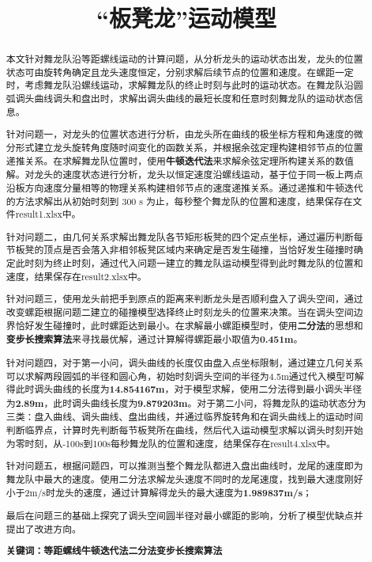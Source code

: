 \documentclass[withoutpreface,bwprint]{cumcmthesis} %
\title{“板凳龙”运动模型}
\begin{document}
	
	\maketitle
	\begin{abstract}
		
	本文针对舞龙队沿等距螺线运动的计算问题，从分析龙头的运动状态出发，龙头的位置状态可由旋转角确定且龙头速度恒定，分别求解后续节点的位置和速度。在螺距一定时，考虑舞龙队沿螺线运动，求解舞龙队的终止时刻与此时的运动状态。在舞龙队沿圆弧调头曲线调头和盘出时，求解出调头曲线的最短长度和任意时刻舞龙队的运动状态信息。
	
	针对问题一，对龙头的位置状态进行分析，由龙头所在曲线的极坐标方程和角速度的微分形式建立龙头旋转角度随时间变化的函数关系，并根据余弦定理构建相邻节点的位置递推关系。在求解舞龙队位置时，使用\textbf{牛顿迭代法}来求解余弦定理所构建关系的数值解。对龙头的速度状态进行分析，龙头以恒定速度沿螺线运动，基于位于同一板上两点沿板方向速度分量相等的物理关系构建相邻节点的速度递推关系。通过递推和牛顿迭代的方法求解出从初始时刻到 300 s 为止，每秒整个舞龙队的位置和速度，结果保存在文件result1.xlsx中。
	
	针对问题二，由几何关系求解出舞龙队各节矩形板凳的四个定点坐标，通过遍历判断每节板凳的顶点是否会落入非相邻板凳区域内来确定是否发生碰撞，当恰好发生碰撞时确定此时刻为终止时刻，通过代入问题一建立的舞龙队运动模型得到此时舞龙队的位置和速度，结果保存在result2.xlsx中。
	
	针对问题三，使用龙头前把手到原点的距离来判断龙头是否顺利盘入了调头空间，通过改变螺距根据问题二建立的碰撞模型选择终止时刻龙头的位置来决策。当在调头空间边界恰好发生碰撞时，此时螺距达到最小。在求解最小螺距模型时，使用\textbf{二分法}的思想和\textbf{变步长搜索算法}来寻找最优解，通过计算解得螺距最小取值为\textbf{0.451m}。
	
	针对问题四，对于第一小问，调头曲线的长度仅由盘入点坐标限制，通过建立几何关系可以求解两段圆弧的半径和圆心角，初始时刻调头空间的半径为4.5m通过代入模型可解得此时调头曲线的长度为\textbf{14.854167m}，对于模型求解，使用二分法得到最小调头半径为\textbf{2.89m}，此时调头曲线长度为\textbf{9.879203m}。对于第二小问，将舞龙队的运动状态分为三类：盘入曲线、调头曲线、盘出曲线，并通过临界旋转角和在调头曲线上的运动时间判断临界点，计算时先判断每节板凳所在曲线，然后代入运动模型求解以调头时刻开始为零时刻，从-100s到100s每秒舞龙队的位置和速度，结果保存在result4.xlsx中。
	
	针对问题五，根据问题四，可以推测当整个舞龙队都进入盘出曲线时，龙尾的速度即为舞龙队中最大的速度。使用二分法求解龙头速度不同时的龙尾速度，找到最大速度刚好小于2m/s时龙头的速度，通过计算解得龙头的最大速度为\textbf{1.989837m/s}；
	
	最后在问题三的基础上探究了调头空间圆半径对最小螺距的影响，分析了模型优缺点并提出了改进方向。
		
		\vspace{0.1cm} 
		\noindent \textbf{关键词：等距螺线\quad 牛顿迭代法\quad 二分法\quad 变步长搜索算法\quad }
		
	\end{abstract}
	\vspace{-1.4cm} 
\end{document}
